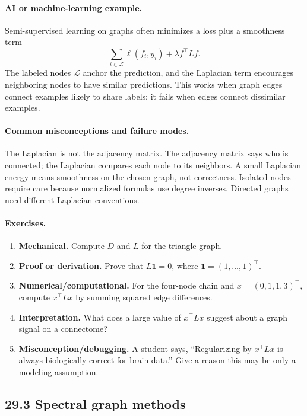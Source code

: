 \paragraph{AI or machine-learning example.}
Semi-supervised learning on graphs often minimizes a loss plus a smoothness term
\[
\sum_{i\in\mathcal L}\ell(f_i,y_i)+\lambda f^\top Lf.
\]
The labeled nodes \(\mathcal L\) anchor the prediction, and the Laplacian term encourages neighboring nodes to have similar predictions. This works when graph edges connect examples likely to share labels; it fails when edges connect dissimilar examples.

\paragraph{Common misconceptions and failure modes.}
The Laplacian is not the adjacency matrix. The adjacency matrix says who is connected; the Laplacian compares each node to its neighbors. A small Laplacian energy means smoothness on the chosen graph, not correctness. Isolated nodes require care because normalized formulas use degree inverses. Directed graphs need different Laplacian conventions.

\paragraph{Exercises.}
\begin{enumerate}[label=\textbf{29.2.\arabic*.}, leftmargin=*]
\item \textbf{Mechanical.} Compute \(D\) and \(L\) for the triangle graph.
\item \textbf{Proof or derivation.} Prove that \(L\mathbf 1=0\), where \(\mathbf 1=(1,\ldots,1)^\top\).
\item \textbf{Numerical/computational.} For the four-node chain and \(x=(0,1,1,3)^\top\), compute \(x^\top Lx\) by summing squared edge differences.
\item \textbf{Interpretation.} What does a large value of \(x^\top Lx\) suggest about a graph signal on a connectome?
\item \textbf{Misconception/debugging.} A student says, ``Regularizing by \(x^\top Lx\) is always biologically correct for brain data.'' Give a reason this may be only a modeling assumption.
\end{enumerate}

\subsection{29.3 Spectral graph methods}

